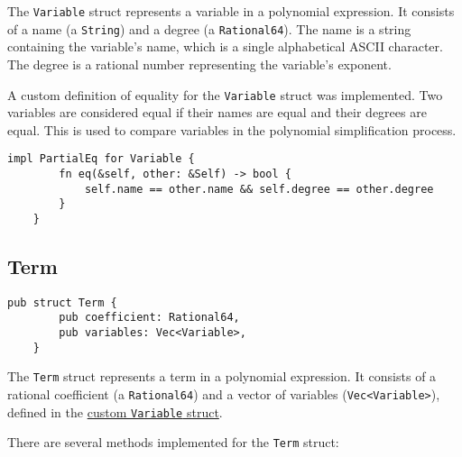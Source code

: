 The \verb|Variable| struct represents a variable in a polynomial expression. It consists of a name (a \verb|String|) and a degree (a \verb|Rational64|). The name is a string containing the variable's name, which is a single alphabetical ASCII character. The degree is a rational number representing the variable's exponent.

A custom definition of equality for the \verb|Variable| struct was implemented. Two variables are considered equal if their names are equal and their degrees are equal. This is used to compare variables in the polynomial simplification process.

\begin{lstlisting}[caption={The implementation of \texttt{PartialEq} for the \texttt{Variable} struct}, label={lst:variable-eq}]
    impl PartialEq for Variable {
        fn eq(&self, other: &Self) -> bool {
            self.name == other.name && self.degree == other.degree
        }
    }
\end{lstlisting}

\subsection{Term}\label{subsec:term}

\begin{lstlisting}[caption={The \texttt{Term} struct}, label={lst:term}]
    pub struct Term {
        pub coefficient: Rational64,
        pub variables: Vec<Variable>,
    }    
\end{lstlisting}

The \verb|Term| struct represents a term in a polynomial expression. It consists of a rational coefficient (a \verb|Rational64|) and a vector of variables (\verb|Vec<Variable>|), defined in the \hyperref[subsec:variable]{custom \texttt{Variable} struct}.

There are several methods implemented for the \verb|Term| struct:

